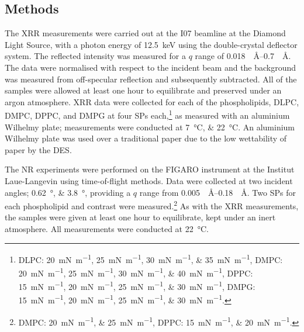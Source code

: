 \subsection{Methods}
The XRR measurements were carried out at the I07 beamline at the Diamond Light Source, with a photon energy of \SI{12.5}{\kilo\electronvolt} using the double-crystal deflector system.\autocite{arnold_implementation_2012}
The reflected intensity was measured for a $q$ range of \SIrange{0.018}{0.7}{\per\angstrom}.
The data were normalised with respect to the incident beam and the background was measured from off-specular reflection and subsequently subtracted.
All of the samples were allowed at least one hour to equilibrate and preserved under an argon atmosphere.
XRR data were collected for each of the phospholipids, DLPC, DMPC, DPPC, and DMPG at four SPs each,\footnote{DLPC: \SIlist{20;25;30;35}{\milli\newton\per\meter}, DMPC: \SIlist{20;25;30;40}{\milli\newton\per\meter}, DPPC: \SIlist{15;20;25;30}{\milli\newton\per\meter}, DMPG: \SIlist{15;20;25;30}{\milli\newton\per\meter}.} as measured with an aluminium Wilhelmy plate; measurements were conducted at \SIlist{7;22}{\celsius}.
An aluminium Wilhelmy plate was used over a traditional paper due to the low wettability of paper by the DES.

The NR experiments were performed on the FIGARO instrument at the Institut Laue-Langevin using time-of-flight methods.\autocite{campbell_figaro_2011}
Data were collected at two incident angles; \SIlist{0.62;3.8}{\degree}, providing a $q$ range from \SIrange{0.005}{0.18}{\per\angstrom}.
Two SPs for each phospholipid and contrast were measured.\footnote{DMPC: \SIlist{20;25}{\milli\newton\per\meter}, DPPC: \SIlist{15;20}{\milli\newton\per\meter}.}
As with the XRR measurements, the samples were given at least one hour to equilibrate, kept under an inert atmosphere.
All measurements were conducted at \SI{22}{\celsius}.
